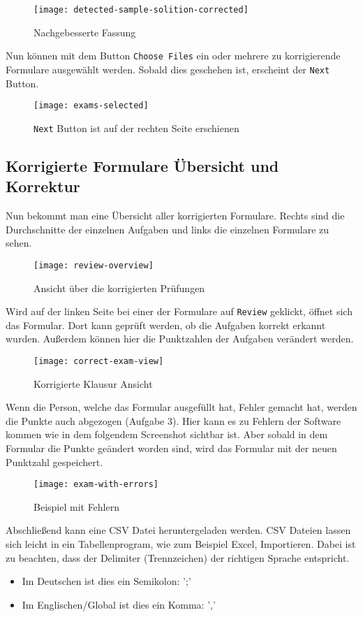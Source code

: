 \begin{figure}[H]
\centering
\texttt{[image: detected-sample-solition-corrected]}
    \caption{Nachgebesserte Fassung}
\end{figure}

Nun k\"onnen mit dem Button \texttt{Choose Files} ein oder mehrere zu korrigierende Formulare ausgew\"ahlt werden.
Sobald dies geschehen ist, erscheint der \texttt{Next} Button.

\begin{figure}[H]
\centering
\texttt{[image: exams-selected]}
    \caption{\texttt{Next} Button ist auf der rechten Seite erschienen}
\end{figure}

\subsection{Korrigierte Formulare \"Ubersicht und Korrektur}

Nun bekommt man eine \"Ubersicht aller korrigierten Formulare.
Rechts sind die Durchschnitte der einzelnen Aufgaben und links die einzelnen Formulare zu sehen.

\begin{figure}[H]
\centering
\texttt{[image: review-overview]}
    \caption{Ansicht über die korrigierten Prüfungen}
\end{figure}

Wird auf der linken Seite bei einer der Formulare auf \texttt{Review} geklickt, \"offnet sich das Formular.
Dort kann gepr\"uft werden, ob die Aufgaben korrekt erkannt wurden.
Au{\ss}erdem k\"onnen hier die Punktzahlen der Aufgaben ver\"andert werden.

\begin{figure}[H]
\centering
\texttt{[image: correct-exam-view]}
    \caption{Korrigierte Klausur Ansicht}
\end{figure}

Wenn die Person, welche das Formular ausgef\"ullt hat, Fehler gemacht hat, werden die Punkte auch abgezogen (Aufgabe 3).
Hier kann es zu Fehlern der Software kommen wie in dem folgendem Screenshot sichtbar ist.
Aber sobald in dem Formular die Punkte ge\"andert worden sind, wird das Formular mit der neuen Punktzahl gespeichert.

\begin{figure}[H]
\centering
\texttt{[image: exam-with-errors]}
    \caption{Beispiel mit Fehlern}
\end{figure}

Abschlie{\ss}end kann eine CSV Datei heruntergeladen werden.
CSV Dateien lassen sich leicht in ein Tabellenprogram, wie zum Beispiel Excel, Importieren.
Dabei ist zu beachten, dass der Delimiter (Trennzeichen) der richtigen Sprache entspricht.
\begin{itemize}
    \item{Im Deutschen ist dies ein Semikolon: ';'}
    \item{Im Englischen/Global ist dies ein Komma: ','}
\end{itemize}
